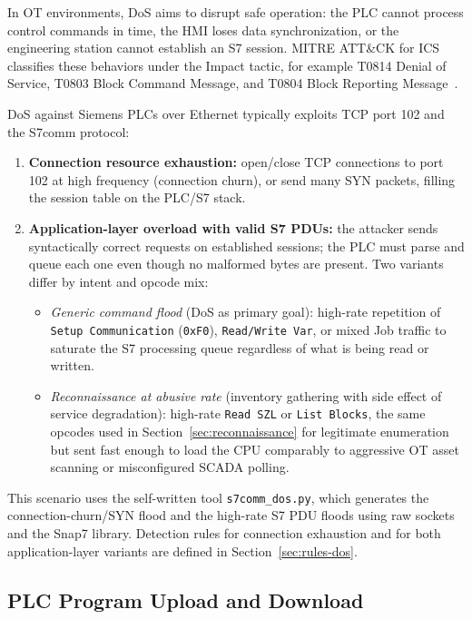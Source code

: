 ﻿\documentclass[../main.tex]{subfiles}
\begin{document}
In OT environments, DoS aims to disrupt safe operation: the PLC cannot process control commands in time, the HMI loses data synchronization, or the engineering station cannot establish an S7 session. MITRE ATT\&CK for ICS classifies these behaviors under the Impact tactic, for example T0814 Denial of Service, T0803 Block Command Message, and T0804 Block Reporting Message~\cite{mitre_ics_attack}.

DoS against Siemens PLCs over Ethernet typically exploits TCP port 102 and the S7comm protocol:

\begin{enumerate}
    \item \textbf{Connection resource exhaustion:} open/close TCP connections to port 102 at high frequency (connection churn), or send many SYN packets, filling the session table on the PLC/S7 stack.

    \item \textbf{Application-layer overload with valid S7 PDUs:} the attacker sends syntactically correct requests on established sessions; the PLC must parse and queue each one even though no malformed bytes are present. Two variants differ by intent and opcode mix:
    \begin{itemize}
        \item \emph{Generic command flood} (DoS as primary goal): high-rate repetition of \texttt{Setup Communication} (\texttt{0xF0}), \texttt{Read/Write Var}, or mixed Job traffic to saturate the S7 processing queue regardless of what is being read or written.
        \item \emph{Reconnaissance at abusive rate} (inventory gathering with side effect of service degradation): high-rate \texttt{Read SZL} or \texttt{List Blocks}, the same opcodes used in Section~\ref{sec:reconnaissance} for legitimate enumeration but sent fast enough to load the CPU comparably to aggressive OT asset scanning or misconfigured SCADA polling.
    \end{itemize}
\end{enumerate}

This scenario uses the self-written tool \texttt{s7comm\_dos.py}, which generates the connection-churn/SYN flood and the high-rate S7 PDU floods using raw sockets and the Snap7 library. Detection rules for connection exhaustion and for both application-layer variants are defined in Section~\ref{sec:rules-dos}.

\subsection{PLC Program Upload and Download}
\label{sec:down_up_program}
\end{document}
